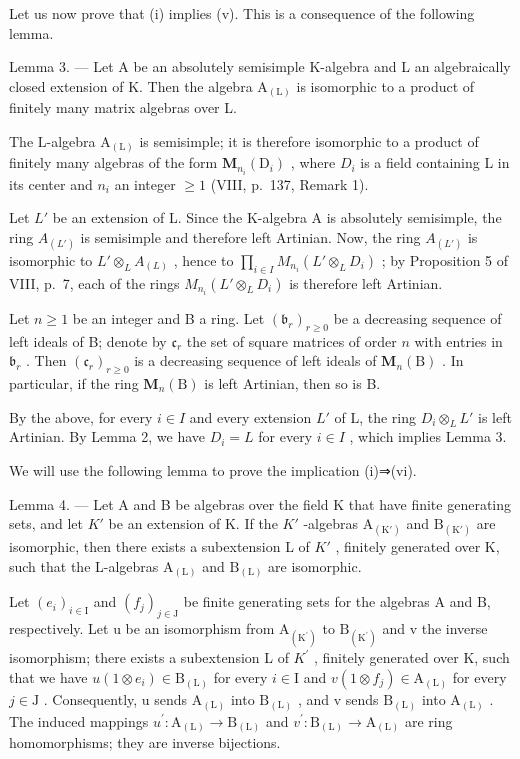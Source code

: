 Let us now prove that (i) implies (v). This is a consequence of the following lemma.

Lemma 3. --- Let A be an absolutely semisimple K-algebra and L an algebraically closed extension of K. Then the algebra \(\mathrm{A}_{(\mathrm{L})}\) is isomorphic to a product of finitely many matrix algebras over L.

The L-algebra \(\mathrm{A}_{(\mathrm{L})}\) is semisimple; it is therefore isomorphic to a product of finitely many algebras of the form \(\mathbf{M}_{n_{i}}(\mathrm{D}_{i})\) , where \(D_{i}\) is a field containing L in its center and \(n_{i}\) an integer \(\geqslant 1\) (VIII, p.~137, Remark 1).

Let \(L'\) be an extension of L. Since the K-algebra A is absolutely semisimple, the ring \(A_{(L')}\) is semisimple and therefore left Artinian. Now, the ring \(A_{(L')}\) is isomorphic to \(L' \otimes_L A_{(L)}\) , hence to \(\prod_{i \in I} M_{n_i}(L' \otimes_L D_i)\) ; by Proposition 5 of VIII, p.~7, each of the rings \(M_{n_i}(L' \otimes_L D_i)\) is therefore left Artinian.

Let \(n \geqslant 1\) be an integer and B a ring. Let \((\mathfrak{b}_r)_{r \geqslant 0}\) be a decreasing sequence of left ideals of B; denote by \(\mathfrak{c}_r\) the set of square matrices of order \(n\) with entries in \(\mathfrak{b}_r\) . Then \((\mathfrak{c}_r)_{r \geqslant 0}\) is a decreasing sequence of left ideals of \(\mathbf{M}_n(\mathrm{B})\) . In particular, if the ring \(\mathbf{M}_n(\mathrm{B})\) is left Artinian, then so is B.

By the above, for every \(i \in I\) and every extension \(L'\) of L, the ring \(D_{i} \otimes_{L} L'\) is left Artinian. By Lemma 2, we have \(D_{i} = L\) for every \(i \in I\) , which implies Lemma 3.

We will use the following lemma to prove the implication (i)⇒(vi).

Lemma 4. --- Let A and B be algebras over the field K that have finite generating sets, and let \(K'\) be an extension of K. If the \(K'\) -algebras \(\mathrm{A}_{(\mathrm{K}')}\) and \(\mathrm{B}_{(\mathrm{K}')}\) are isomorphic, then there exists a subextension L of \(K'\) , finitely generated over K, such that the L-algebras \(\mathrm{A}_{(\mathrm{L})}\) and \(\mathrm{B}_{(\mathrm{L})}\) are isomorphic.

Let \((e_{i})_{i\in\mathrm{I}}\) and \((f_{j})_{j\in\mathrm{J}}\) be finite generating sets for the algebras A and B, respectively. Let u be an isomorphism from \(\mathrm{A}_{(\mathrm{K}^{\prime})}\) to \(\mathrm{B}_{(\mathrm{K}^{\prime})}\) and v the inverse isomorphism; there exists a subextension L of \(K^{\prime}\) , finitely generated over K, such that we have \(u(1\otimes e_{i})\in\mathrm{B}_{(\mathrm{L})}\) for every \(i\in\mathrm{I}\) and \(v(1\otimes f_{j})\in\mathrm{A}_{(\mathrm{L})}\) for every \(j\in\mathrm{J}\) . Consequently, u sends \(\mathrm{A}_{(\mathrm{L})}\) into \(\mathrm{B}_{(\mathrm{L})}\) , and v sends \(\mathrm{B}_{(\mathrm{L})}\) into \(\mathrm{A}_{(\mathrm{L})}\) . The induced mappings \(u^{\prime}:\mathrm{A}_{(\mathrm{L})}\to\mathrm{B}_{(\mathrm{L})}\) and \(v^{\prime}:\mathrm{B}_{(\mathrm{L})}\to\mathrm{A}_{(\mathrm{L})}\) are ring homomorphisms; they are inverse bijections.

